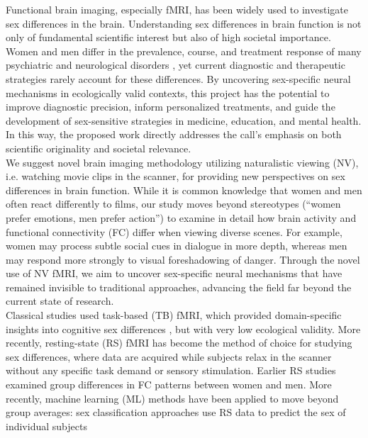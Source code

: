 \documentclass[11pt,a4paper]{article}
\begin{document}
Functional brain imaging, especially fMRI, has been widely used to investigate sex differences in the brain. 
Understanding sex differences in brain function is not only of fundamental scientific interest but also of high societal importance. 
Women and men differ in the prevalence, course, and treatment response of many psychiatric and neurological disorders \parencite{cahillWhySexMatters2006,gobinathSexHormonesGenotype2017}, 
yet current diagnostic and therapeutic strategies rarely account for these differences. By uncovering sex-specific neural mechanisms 
in ecologically valid contexts, this project has the potential to improve diagnostic precision, inform personalized treatments, 
and guide the development of sex-sensitive strategies in medicine, education, and mental health. 
In this way, the proposed work directly addresses the call's emphasis on both scientific originality and societal relevance.\\
We suggest novel brain imaging methodology utilizing naturalistic viewing (NV), i.e. watching movie 
clips in the scanner, for providing new perspectives on sex differences in brain function. While it is common knowledge 
that women and men often react differently to films, our study moves beyond stereotypes (“women prefer emotions, 
men prefer action”) to examine in detail how brain activity and functional connectivity (FC) differ when 
viewing diverse scenes. For example, women may process subtle social cues in dialogue in more depth, whereas 
men may respond more strongly to visual foreshadowing of danger. Through the novel use of NV fMRI, we aim to uncover 
sex-specific neural mechanisms that have remained invisible to traditional approaches, advancing the field far beyond 
the current state of research.\\
Classical studies used task-based (TB) fMRI, which provided domain-specific insights into cognitive sex differences 
\parencite{thimmMenstrualCycleEffects2014a,weisDynamicChangesFunctional2011,weisEstradiolModulatesFunctional2008}, 
but with very low ecological validity. More recently, resting-state (RS) fMRI has become the method of choice
for studying sex differences, where data are acquired while subjects relax in the scanner without any specific task 
demand or sensory stimulation. Earlier RS studies examined group differences in FC patterns between women and men. 
More recently, machine learning (ML) methods have been applied to move beyond group averages: 
sex classification approaches use RS data to predict the sex of individual subjects 
\end{document}
